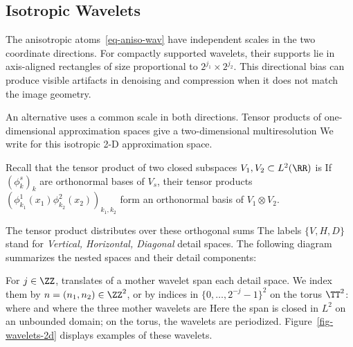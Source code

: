 \subsection{Isotropic Wavelets}\label{sec-isotropic-wav}

The anisotropic atoms~\eqref{eq-aniso-wav} have independent scales in the two coordinate directions. For compactly supported wavelets, their supports lie in axis-aligned rectangles of size proportional to $2^{j_1}\times2^{j_2}$. This directional bias can produce visible artifacts in denoising and compression when it does not match the image geometry.


An alternative uses a common scale in both directions. Tensor products of one-dimensional approximation spaces give a two-dimensional multiresolution
We write
for this isotropic 2-D approximation space.

Recall that the tensor product of two closed subspaces $V_1,V_2\subset L^2(\RR)$ is
If $(\phi_k^s)_k$ are orthonormal bases of $V_s$, their tensor products $(\phi_{k_1}^1(x_1)\phi_{k_2}^2(x_2))_{k_1,k_2}$ form an orthonormal basis of $V_1 \otimes V_2$.

The tensor product distributes over these orthogonal sums
The labels $\{V,H,D\}$ stand for \textit{Vertical, Horizontal, Diagonal} detail spaces.
%
The following diagram summarizes the nested spaces and their detail components:
\begin{center}
\end{center}

For $j \in \ZZ$, translates of a mother wavelet span each detail space. We index them by $n=(n_1,n_2)\in\ZZ^2$, or by indices in $\{0,\ldots,2^{-j}-1\}^2$ on the torus $\TT^2$:
where
and where the three mother wavelets are
Here the span is closed in $L^2$ on an unbounded domain; on the torus, the wavelets are periodized. Figure~\ref{fig-wavelets-2d} displays examples of these wavelets.

